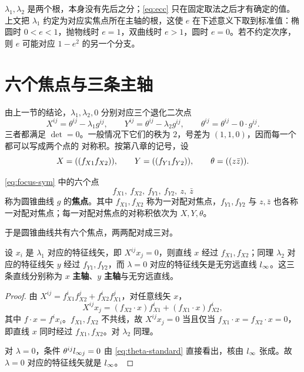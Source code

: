 \begin{remark}[次序的约定]
$\lambda_1,\lambda_2$ 是两个根，本身没有先后之分；\eqref{eq:ecc} 只在固定取法之后才有确定的值。
上文把 $\lambda_1$ 约定为对应实焦点所在主轴的根，这使 $e$ 在下述意义下取到标准值：椭圆时
$0<e<1$，抛物线时 $e=1$，双曲线时 $e>1$，圆时 $e=0$。若不约定次序，则 $e$ 可能对应
$1-e^2$ 的另一个分支。
\end{remark}

\section{六个焦点与三条主轴}

由上一节的结论，$\lambda_1,\lambda_2,0$ 分别对应三个退化二次点
\begin{equation}
X^{ij}=\theta^{ij}-\lambda_1g^{ij},\qquad
Y^{ij}=\theta^{ij}-\lambda_2g^{ij},\qquad
\theta^{ij}=\theta^{ij}-0\cdot g^{ij}.
\label{eq:XYZ}
\end{equation}
三者都满足 $\det=0$。一般情况下它们的秩为 $2$，号差为 $(1,1,0)$，因而每一个都可以写成两个点的
对称积。按第八章的记号，设
\begin{equation}
X=((f_{X1}f_{X2})),\qquad
Y=((f_{Y1}f_{Y2})),\qquad
\theta=((z\bar z)).
\label{eq:focus-sym}
\end{equation}

\begin{definition}[焦点]
\eqref{eq:focus-sym} 中的六个点
\[
f_{X1},\ f_{X2},\ f_{Y1},\ f_{Y2},\ z,\ \bar z
\]
称为圆锥曲线 $g$ 的\textbf{焦点}。其中 $f_{X1},f_{X2}$ 称为一对配对焦点，$f_{Y1},f_{Y2}$ 与
$z,\bar z$ 也各称一对配对焦点；每一对配对焦点的对称积依次为 $X,Y,\theta$。
\end{definition}

于是圆锥曲线共有六个焦点，两两配对成三对。

\begin{proposition}[主轴]
设 $x_i$ 是 $\lambda_1$ 对应的特征线矢，即
$X^{ij}x_j=0$，则直线 $x$ 经过 $f_{X1},f_{X2}$；同理 $\lambda_2$ 对应的特征线矢 $y$ 经过
$f_{Y1},f_{Y2}$，而 $\lambda=0$ 对应的特征线矢是无穷远直线 $l_{\infty}$。这三条直线分别称为
$x$ \textbf{主轴}、$y$ \textbf{主轴}与无穷远直线。
\end{proposition}

\begin{proof}
由 $X^{ij}=f_{X1}^if_{X2}^j+f_{X2}^if_{X1}^j$，对任意线矢 $x$，
\[
X^{ij}x_j=(f_{X2}\cdot x)f_{X1}^i+(f_{X1}\cdot x)f_{X2}^i,
\]
其中 $f\cdot x=f^ix_i$。$f_{X1},f_{X2}$ 不共线，故 $X^{ij}x_j=0$ 当且仅当
$f_{X1}\cdot x=f_{X2}\cdot x=0$，即直线 $x$ 同时经过 $f_{X1},f_{X2}$。对 $\lambda_2$ 同理。

对 $\lambda=0$，条件 $\theta^{ij}l_{\infty j}=0$ 由 \eqref{eq:theta-standard} 直接看出，核由
$l_{\infty}$ 张成。故 $\lambda=0$ 对应的特征线矢就是 $l_{\infty}$。
\end{proof}

